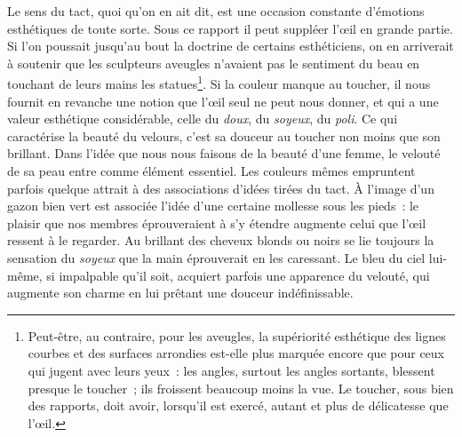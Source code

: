 \documentclass[french,twoside]{book} %
\begin{document}
Le sens du tact, quoi qu’on en ait dit, est une occasion constante d’émotions esthétiques de toute sorte. Sous ce rapport il peut suppléer l’œil en grande partie. Si l’on poussait jusqu’au bout la doctrine de certains esthéticiens, on en arriverait à soutenir que les sculpteurs aveugles n’avaient pas le sentiment du beau en touchant de leurs mains les statues\footnote{Peut-être, au contraire, pour les aveugles, la supériorité esthétique des lignes courbes et des surfaces arrondies est-elle plus marquée encore que pour ceux qui jugent avec leurs yeux : les angles, surtout les angles sortants, blessent presque le toucher ; ils froissent beaucoup moins la vue. Le toucher, sous bien des rapports, doit avoir, lorsqu’il est exercé, autant et plus de délicatesse que l’œil.}. Si la couleur manque au toucher, il nous fournit en revanche une notion que l’œil seul ne peut nous donner, et qui a une valeur esthétique considérable, celle du \emph{doux},  du \emph{soyeux}, du \emph{poli}. Ce qui caractérise la beauté du velours, c’est sa douceur au toucher non moins que son brillant. Dans l’idée que nous nous faisons de la beauté d’une femme, le velouté de sa peau entre comme élément essentiel. Les couleurs mêmes empruntent parfois quelque attrait à des associations d’idées tirées du tact. À l’image d’un gazon bien vert est associée l’idée d’une certaine mollesse sous les pieds : le plaisir que nos membres éprouveraient à s’y étendre augmente celui que l’œil ressent à le regarder. Au brillant des cheveux blonds ou noirs se lie toujours la sensation du \emph{soyeux} que la main éprouverait en les caressant. Le bleu du ciel lui-même, si impalpable qu’il soit, acquiert parfois une apparence du velouté, qui augmente son charme en lui prêtant une douceur indéfinissable.\par
\end{document}
